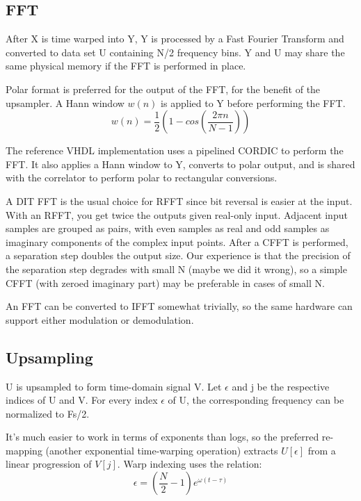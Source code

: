 \subsection{FFT}

After X is time warped into Y, Y is processed by a Fast Fourier Transform and
converted to data set U containing N/2 frequency bins. Y and U may share the
same physical memory if the FFT is performed in place.

Polar format is preferred for the output of the FFT,
for the benefit of the upsampler.
A Hann window $w(n)$ is applied to Y before performing the FFT.
\begin{equation}
w(n) = \frac{1}{2}\left(1 - cos\left( \frac{2\pi n}{N-1} \right)\right)
\end{equation}


The reference VHDL implementation uses a pipelined CORDIC to perform the FFT.
It also applies a Hann window to Y, converts to polar output, and is shared with
the correlator to perform polar to rectangular conversions.

A DIT FFT is the usual choice for RFFT since bit reversal is easier at the input.
With an RFFT, you get twice the outputs given real-only input.
Adjacent input samples are grouped as pairs, with even samples as real and odd
samples as imaginary components of the complex input points.
After a CFFT is performed, a separation step doubles the output size.
Our experience is that the precision of the separation step degrades with small N
(maybe we did it wrong), so a simple CFFT (with zeroed imaginary part)
may be preferable in cases of small N.

An FFT can be converted to IFFT somewhat trivially, so the same hardware can
support either modulation or demodulation.

\subsection{Upsampling}

U is upsampled to form time-domain signal V.
Let $\epsilon$ and j be the respective indices of U and V.
For every index $\epsilon$ of U, the corresponding frequency can be normalized
to Fs/2.

It's much easier to work in terms of exponents than logs,
so the preferred re-mapping (another exponential time-warping operation)
extracts $U[\epsilon]$ from a linear progression of $V[j]$.
Warp indexing uses the relation:
\begin{equation}
\epsilon = \left(\frac{N}{2}-1\right) e^{\omega(t - \tau)}
\end{equation}


